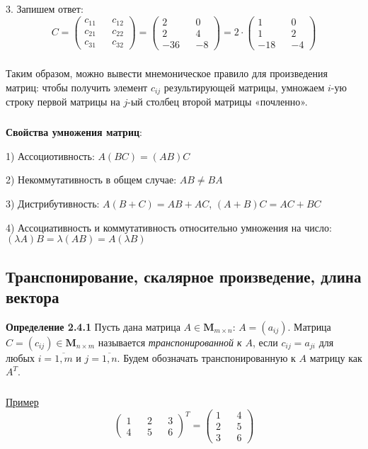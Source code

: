 \documentclass[12pt,a4paper]{article}
\begin{document}
3. Запишем ответ:
\[C = \begin{pmatrix}
c_{11} && c_{12} \\
c_{21} && c_{22} \\
c_{31} && c_{32}
\end{pmatrix} = \begin{pmatrix}
2 && 0 \\
2 && 4 \\
-36 && -8 
\end{pmatrix} = 2 \cdot \begin{pmatrix}
1 && 0 \\
1 && 2 \\
-18 && -4
\end{pmatrix} \]

\subparagraph{}
Таким образом, можно вывести мнемоническое правило для произведения матриц: чтобы получить элемент $c_{ij}$ результирующей матрицы, умножаем $i$-ую строку первой матрицы на $j$-ый столбец второй матрицы «почленно».

\subparagraph{}
\textbf{Свойства умножения матриц}:

1) Ассоциотивность: $A(BC) = (AB)C$

2) Некоммутативность в общем случае: $AB \neq BA$

3) Дистрибутивность: $A(B + C) = AB + AC$, $(A+B)C = AC + BC$

4) Ассоциативность и коммутативность относительно умножения на число: $(\lambda A)B = \lambda(AB) = A(\lambda B)$

\subsection{Транспонирование, скалярное произведение, длина вектора}
\textbf{Определение 2.4.1} 
Пусть дана матрица $A \in \textbf{M}_{m \times n}$: $A = (a_{ij})$. Матрица $C = (c_{ij}) \in \textbf{M}_{n \times m}$ называется \textit{транспонированной к $A$}, если $c_{ij} = a_{ji}$ для любых $i = \overline{1, m}$ и $j = \overline{1, n}$. Будем обозначать транспонированную к $A$ матрицу как $A^T$.

\subparagraph{}
\underline{Пример}
\[\begin{pmatrix}
1 && 2 && 3 \\
4 && 5 && 6
\end{pmatrix}^T = \begin{pmatrix}
1 && 4 \\
2 && 5 \\
3 && 6
\end{pmatrix}
\]
\end{document}
